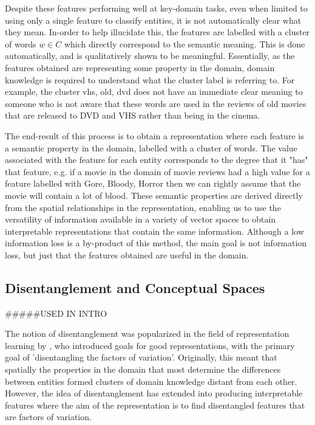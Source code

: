 Despite these features performing well at key-domain tasks, even when limited to using only a single feature to classify entities, it is not automatically clear what they mean. In-order to help illucidate this, the features are labelled with a cluster of words $w \in C$ which directly correspond to the semantic meaning. This is done automatically, and is qualitatively shown to be meaningful. Essentially, as the features obtained are representing  some property in the domain, domain knowledge is required to understand what the cluster label is referring to. For example, the cluster {vhs, old, dvd} does not have an immediate clear meaning to someone who is not aware that these words are used in the reviews of old movies that are released to DVD and VHS rather than being in the cinema.

The end-result of this process is to obtain a representation where each feature is a semantic property in the domain, labelled with a cluster of words. The value associated with the feature for each entity corresponds to the degree that it "has" that feature, e.g. if a movie in the domain of movie reviews had a high value for  a feature labelled with {Gore, Bloody, Horror} then we can rightly assume that the movie will contain a lot of blood. These semantic properties are derived directly from the spatial relationships in the representation, enabling us to use the versatility of information available in a variety of vector spaces to obtain interpretable representations that contain the same information. Although a low information loss is a by-product of this method, the main goal is not information loss, but just that the features obtained are useful in the domain.




\subsection{Disentanglement and Conceptual Spaces} #####USED IN INTRO

The notion of disentanglement was popularized in the field of representation learning by  \cite{Bengio2013}, who introduced goals for good representations, with the primary goal of 'disentangling the factors of variation'. Originally, this meant that spatially the properties in the domain that most determine the differences between entities formed clusters  of domain knowledge distant from each other. However, the idea of disentanglement has extended into producing interpretable features \cite{Hu} where the aim of the representation is to find disentangled features that are factors of variation.



